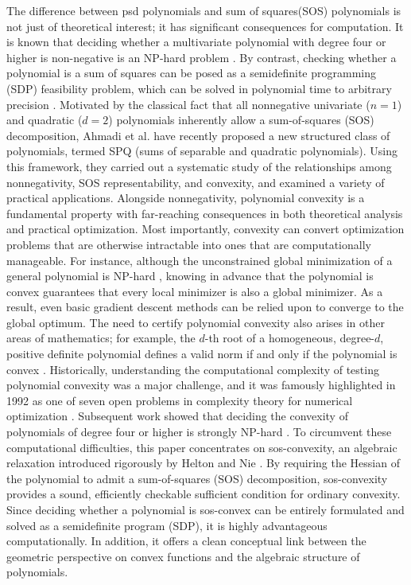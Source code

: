 \documentclass[12pt]{elsarticle}
\theoremstyle{definition}
\begin{document}
The difference between psd polynomials and sum of squares(SOS) polynomials is not just of theoretical interest; it has significant consequences for computation. It is known that deciding whether a multivariate polynomial with degree four or higher is non-negative is an NP-hard problem \cite{murty1987some}. By contrast, checking whether a polynomial is a sum of squares can be posed as a semidefinite programming (SDP) feasibility problem, which can be solved in polynomial time to arbitrary precision \cite{vandenberghe1996semidefinite}. Motivated by the classical fact that all nonnegative univariate ($n=1$) and quadratic ($d=2$) polynomials inherently allow a sum-of-squares (SOS) decomposition, Ahmadi et al. \cite{ahmadi2023sums} have recently proposed a new structured class of polynomials, termed SPQ (sums of separable and quadratic polynomials). Using this framework, they carried out a systematic study of the relationships among nonnegativity, SOS representability, and convexity, and examined a variety of practical applications.
Alongside nonnegativity, polynomial convexity is a fundamental property with far-reaching consequences in both theoretical analysis and practical optimization. Most importantly, convexity can convert optimization problems that are otherwise intractable into ones that are computationally manageable. For instance, although the unconstrained global minimization of a general polynomial is NP-hard \cite{parrilo2001minimizing}, knowing in advance that the polynomial is convex guarantees that every local minimizer is also a global minimizer. As a result, even basic gradient descent methods can be relied upon to converge to the global optimum. The need to certify polynomial convexity also arises in other areas of mathematics; for example, the $d$-th root of a homogeneous, degree-$d$, positive definite polynomial defines a valid norm if and only if the polynomial is convex \cite{reznick2011blenders}. Historically, understanding the computational complexity of testing polynomial convexity was a major challenge, and it was famously highlighted in 1992 as one of seven open problems in complexity theory for numerical optimization \cite{pardalos1992open}. Subsequent work showed that deciding the convexity of polynomials of degree four or higher is strongly NP-hard \cite{ahmadi2013np}. To circumvent these computational difficulties, this paper concentrates on sos-convexity, an algebraic relaxation introduced rigorously by Helton and Nie \cite{helton2010semidefinite}. By requiring the Hessian of the polynomial to admit a sum-of-squares (SOS) decomposition, sos-convexity provides a sound, efficiently checkable sufficient condition for ordinary convexity. Since deciding whether a polynomial is sos-convex can be entirely formulated and solved as a semidefinite program (SDP), it is highly advantageous computationally. In addition, it offers a clean conceptual link between the geometric perspective on convex functions and the algebraic structure of polynomials.
\end{document}
